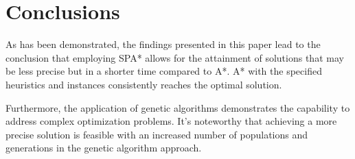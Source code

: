 \documentclass[runningheads]{llncs}
\begin{document}
% 
%
\section{Conclusions}
As has been demonstrated, the findings presented in this paper lead to the conclusion that employing SPA* allows for the attainment of solutions that may be less precise but in a shorter time compared to A*. A* with the specified heuristics and instances consistently reaches the optimal solution.

Furthermore, the application of genetic algorithms demonstrates the capability to address complex optimization problems. It's noteworthy that achieving a more precise solution is feasible with an increased number of populations and generations in the genetic algorithm approach.

%
%
%


%
\end{document}
